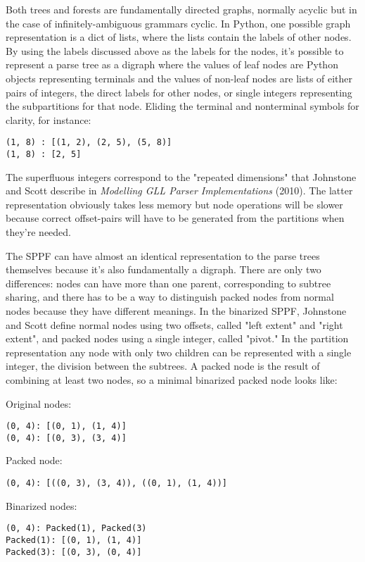 \documentclass[12pt]{article}
\begin{document}
Both trees and forests are fundamentally directed graphs, normally
acyclic but in the case of infinitely-ambiguous grammars cyclic.  In
Python, one possible graph representation is a dict of lists, where
the lists contain the labels of other nodes.  By using the labels
discussed above as the labels for the nodes, it's possible to
represent a parse tree as a digraph where the values of leaf nodes are
Python objects representing terminals and the values of non-leaf nodes
are lists of either pairs of integers, the direct labels for other
nodes, or single integers representing the subpartitions for that
node.  Eliding the terminal and nonterminal symbols for clarity, for
instance:

\begin{verbatim}
(1, 8) : [(1, 2), (2, 5), (5, 8)]
(1, 8) : [2, 5]
\end{verbatim}

The superfluous integers correspond to the "repeated dimensions" that
Johnstone and Scott describe in \emph{Modelling GLL Parser
  Implementations} (2010).  The latter representation obviously takes
less memory but node operations will be slower because correct
offset-pairs will have to be generated from the partitions when
they're needed.

The SPPF can have almost an identical representation to the parse
trees themselves because it's also fundamentally a digraph.  There are
only two differences: nodes can have more than one parent,
corresponding to subtree sharing, and there has to be a way to
distinguish packed nodes from normal nodes because they have different
meanings.  In the binarized SPPF, Johnstone and Scott define normal
nodes using two offsets, called "left extent" and "right extent", and
packed nodes using a single integer, called "pivot."  In the
partition representation any node with only two children can be
represented with a single integer, the division between the subtrees.
A packed node is the result of combining at least two nodes, so a
minimal binarized packed node looks like:

Original nodes:
\begin{verbatim}
(0, 4): [(0, 1), (1, 4)]
(0, 4): [(0, 3), (3, 4)]
\end{verbatim}

Packed node:
\begin{verbatim}
(0, 4): [((0, 3), (3, 4)), ((0, 1), (1, 4))]
\end{verbatim}

Binarized nodes:
\begin{verbatim}
(0, 4): Packed(1), Packed(3)
Packed(1): [(0, 1), (1, 4)]
Packed(3): [(0, 3), (0, 4)]
\end{verbatim}
\end{document}
